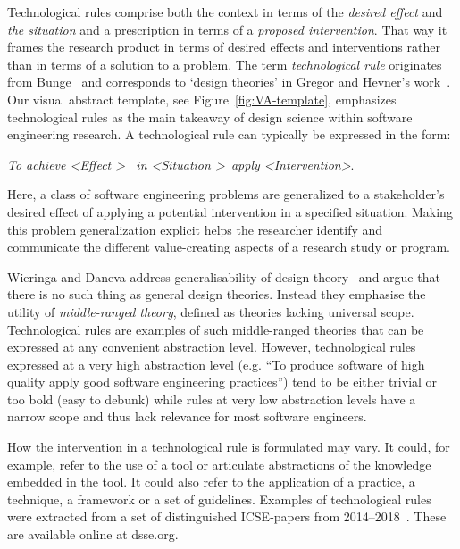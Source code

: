 \documentclass[graybox]{svmult}
\begin{document}
Technological rules comprise both the context in terms of the \emph{desired effect} and \emph{the situation} and a prescription in terms of a \emph{proposed intervention}. That way it frames the research product in terms of desired effects and interventions rather than in terms of a solution to a problem. The term \emph{technological rule} originates from Bunge~\cite{bunge_philosophy_1998} and corresponds to `design theories' in Gregor and Hevner's work~\cite{gregor_positioning_2013}. Our visual abstract template,  see Figure~\ref{fig:VA-template}, emphasizes technological rules as the main takeaway of design science within software engineering research. A technological rule can typically be expressed in the form: 

\begin{center}{\emph{To achieve \textless Effect \textgreater ~ in \textless Situation \textgreater~apply \textless Intervention\textgreater}.} 
\end{center}

Here, a class of software engineering problems are generalized to a stakeholder's desired effect of applying a potential intervention in a specified situation. 
Making this problem generalization explicit helps the researcher identify and communicate the different value-creating aspects of a research study or program.



Wieringa and Daneva address generalisability of design theory~\cite{wieringa_six_2015} and argue that there is no such thing as general design theories. Instead they emphasise the utility of \emph{middle-ranged theory}, defined as theories lacking universal scope. 
Technological rules are examples of such middle-ranged theories that can be expressed at any convenient abstraction level. However, technological rules expressed at a very high abstraction level (e.g. ``To produce software of high quality apply good software engineering practices'') tend to be either trivial or too bold (easy to debunk) while rules at very low abstraction levels have a narrow scope and thus lack relevance for most software engineers. 

How the intervention in a technological rule is formulated may vary. It could, for example, refer to the use of a tool or articulate abstractions of the knowledge embedded in the tool. It could also refer to the application of a practice, a technique, a framework or a set of guidelines. Examples of technological rules were extracted from a set of distinguished ICSE-papers from 2014--2018~\cite{Engstrom19arxiv}. These are available online at dsse.org.
\end{document}
